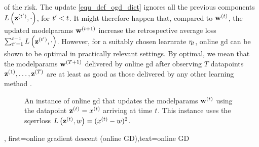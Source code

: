 {{of the \gls{risk}. The update \eqref{equ_def_ogd_dict} ignores all the previous components $L\left({\bf z}^{(t')},\cdot \right)$, 
for $t' < t$. It might therefore happen that, compared to ${\bf w}^{(t)}$, the updated \gls{modelparams} 
${\bf w}^{(t+1)}$ increase the retrospective average \gls{loss} $\sum_{t'=1}^{t-1} L\left({\bf z}^{(t')},\cdot \right)$. 
However, for a suitably chosen \gls{learnrate} $\eta_{t}$, online \gls{gd} can be shown 
to be optimal in practically relevant settings. By optimal, we mean that the \gls{modelparams} 
${\bf w}^{(T+1)}$ delivered by online \gls{gd} after observing $T$ \gls{datapoint}s ${\bf z}^{(1)},\ldots, {\bf z}^{(T)}$ 
are at least as good as those delivered by any other learning method \cite{HazanOCO,GDOptimalRakhlin2012}. 
\begin{figure}[H]
	\begin{center}
\end{center} 
\caption{An instance of online \gls{gd} that updates the \gls{modelparams} ${\bf w}^{(t)}$ 
using the \gls{datapoint} ${\bf z}^{(t)} = x^{(t)}$ arriving at time $t$. 
This instance uses the \gls{sqerrloss} $L\left({\bf z}^{(t)},w \right) = (x^{(t)} - w)^{2}$.
}
\end{figure}},
first={online gradient descent (online GD)},text={online GD}}

